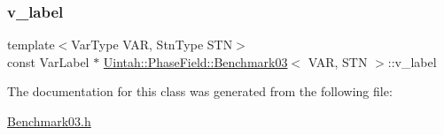 \subsubsection{\texorpdfstring{v\+\_\+label}{v\_label}}
{\footnotesize\ttfamily template$<$Var\+Type V\+AR, Stn\+Type S\+TN$>$ \\
const Var\+Label $\ast$ \hyperlink{classUintah_1_1PhaseField_1_1Benchmark03}{Uintah\+::\+Phase\+Field\+::\+Benchmark03}$<$ V\+AR, S\+TN $>$\+::v\+\_\+label\hspace{0.3cm}{\ttfamily [protected]}}



The documentation for this class was generated from the following file\+:\begin{DoxyCompactItemize}
\item 
\hyperlink{Benchmark03_8h}{Benchmark03.\+h}\end{DoxyCompactItemize}
